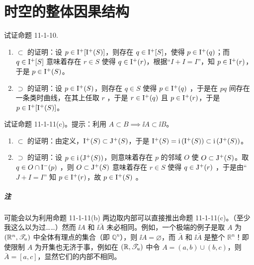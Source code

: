 
\chapter{时空的整体因果结构}

\begin{xiti}
    \item 试证命题 11-1-10.

    \begin{zm}
        \begin{enumerate}
            \item $\subset$ 的证明：设 $p \in \mathrm{I}^+[\mathrm{I}^+(S)]$，则存在 $q \in \mathrm{I}^+[S] $，使得 $p \in \mathrm{I}^+(q)$；而 $q \in \mathrm{I}^+ [S]$ 意味着存在 $r \in S$ 使得 $q \in \mathrm{I}^+ (r)$，根据“$I+I=I$”，知 $p \in \mathrm{I}^+(r)$，于是 $p \in \mathrm{I}^+(S)$。
            \item $\supset$ 的证明：设 $p \in \mathrm{I}^+(S)$，则存在 $q \in S$ 使得 $p \in \mathrm{I}^+(q)$ ，于是在 $pq$ 间存在一条类时曲线，在其上任取 $r$ ，于是 $r \in \mathrm{I}^+(q)$ 且 $p \in \mathrm{I}^+(r)$，于是 $p \in \mathrm{I}^+[\mathrm{I}^+(S)]$。
        \end{enumerate}
    \end{zm}

    \item 试证命题 11-1-11(c)。提示：利用 $A \subset B \implies \ii{A} \subset \ii{B}$。

    \begin{zm}
        \begin{enumerate}
            \item $\subset$ 的证明：由定义，$\mathrm{I}^+(S) \subset \mathrm{J}^+ (S)$，于是 $\mathrm{I}^+(S) = \mathrm{i}\left( \mathrm{I}^+ (S) \right) \subset \mathrm{i}\left( \mathrm{J}^+(S) \right)$。
            \item $\supset$ 的证明：设 $p \in \mathrm{i}\left( \mathrm{J}^+(S) \right)$，则意味着存在 $p$ 的邻域 $O$ 使 $O \subset \mathrm{J}^+(S)$。取 $q \in O \cap \mathrm{I}^-(p)$ ，则 $O \subset \mathrm{J}^+(S)$ 意味着存在 $r \in S$ 使得 $q\in \mathrm{J}^+(r)$ ，于是由“$J + I = I$” 知 $p \in \mathrm{I}^+(r)$，故 $p \in \mathrm{I}^+(S)$ 。
        \end{enumerate}

        \paragraph{注} 可能会以为利用命题 11-1-11(b) 两边取内部可以直接推出命题 11-1-11(c)。（至少我这么以为过……）然而 $\ii{A}$ 和 $\ii{\bar{A}}$ 未必相同。例如，一个极端的例子是取 $A$ 为 $\left(\mathbb{R}^n,\mathscr{T}_u\right)$ 中全体有理点的集合（即 $\mathbb{Q}^n$），则 $\ii{A}= \varnothing$，而 $\bar{A}$ 和 $\ii{\bar{A}}$ 是整个 $\mathbb{R}^n$！即使限制 $A$ 为开集也无济于事，例如在 $(\mathbb{R},\mathscr{T}_u)$ 中令 $A = (a,b) \cup (b,c)$，则 $\bar{A} = [a,c]$，显然它们的内部不相同。
    \end{zm}


\end{xiti}
